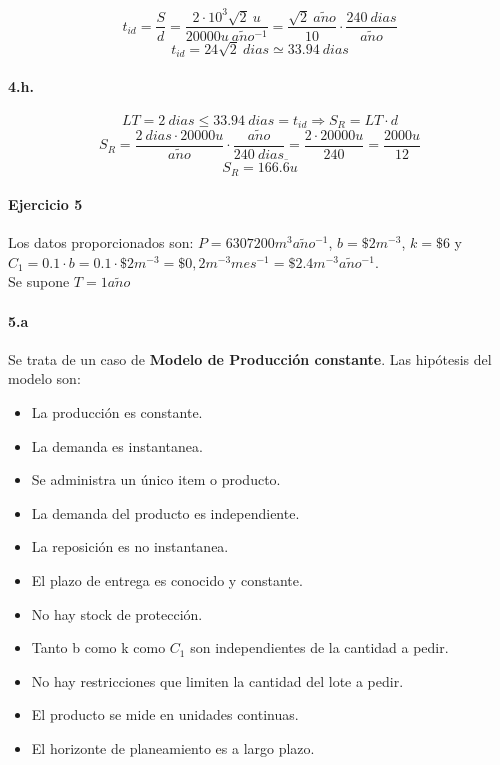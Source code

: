 \documentclass{article}
\def \anio {a\tilde{n}o}
\begin{document}
        $$ t_{id} = \frac{S}{d} = \frac{2 \cdot 10^3 \sqrt {2}\ u}{20000u\ \anio^{-1}} = \frac{\sqrt{2}\ \anio}{10} \cdot \frac{240\ dias}{\anio} $$
        $$ \boxed{ t_{id} = 24\sqrt{2}\ dias \simeq 33.94\ dias } $$
    
    \paragraph{4.h.}
        $$ LT = 2\ dias \leq 33.94\ dias = t_{id} \Rightarrow S_R = LT \cdot d $$
        $$ S_R = \frac{2\ dias \cdot 20000u}{\anio} \cdot \frac{\anio}{240\ dias} = \frac{2 \cdot 20000u}{240} = \frac{2000u}{12} $$
        $$ \boxed{S_R = 166.\overline{6} u} $$


\paragraph{Ejercicio 5}
Los datos proporcionados son: $P = 6307200 m^3 \anio^{-1} $, $b = \$2 m^{-3} $, $k = \$6 $ y $C_1 = 0.1 \cdot b = 0.1 \cdot \$2 m^{-3} = \$0,2 m^{-3}mes^{-1} = \$2.4 m^{-3}\anio^{-1} $. \\
Se supone $T = 1 \anio$
  \paragraph{5.a}
  Se trata de un caso de {\bf Modelo de Producci\'on constante}. Las hip\'otesis del modelo son:
 \begin{itemize}
  \item La producci\'on es constante.
  \item La demanda es instantanea.
  \item Se administra un \'unico item o producto.
  \item La demanda del producto es independiente.
  \item La reposici\'on es no instantanea.
  \item El plazo de entrega es conocido y constante.
  \item No hay stock de protecci\'on.
  \item Tanto b como k como $ C_1 $ son independientes de la cantidad a pedir.
  \item No hay restricciones que limiten la cantidad del lote a pedir.
  \item El producto se mide en unidades continuas.
  \item El horizonte de planeamiento es a largo plazo.
 \end{itemize}
\end{document}
